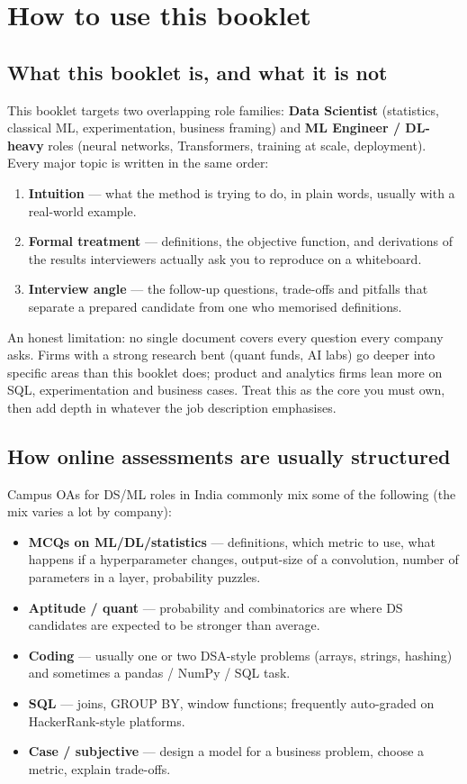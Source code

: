 \chapter{How to use this booklet}

\section*{What this booklet is, and what it is not}
This booklet targets two overlapping role families: \textbf{Data Scientist} (statistics, classical ML, experimentation, business framing) and \textbf{ML Engineer / DL-heavy} roles (neural networks, Transformers, training at scale, deployment). Every major topic is written in the same order:
\begin{enumerate}
  \item \textbf{Intuition} --- what the method is trying to do, in plain words, usually with a real-world example.
  \item \textbf{Formal treatment} --- definitions, the objective function, and derivations of the results interviewers actually ask you to reproduce on a whiteboard.
  \item \textbf{Interview angle} --- the follow-up questions, trade-offs and pitfalls that separate a prepared candidate from one who memorised definitions.
\end{enumerate}

An honest limitation: no single document covers every question every company asks. Firms with a strong research bent (quant funds, AI labs) go deeper into specific areas than this booklet does; product and analytics firms lean more on SQL, experimentation and business cases. Treat this as the core you must own, then add depth in whatever the job description emphasises.

\section*{How online assessments are usually structured}
Campus OAs for DS/ML roles in India commonly mix some of the following (the mix varies a lot by company):
\begin{itemize}
  \item \textbf{MCQs on ML/DL/statistics} --- definitions, which metric to use, what happens if a hyperparameter changes, output-size of a convolution, number of parameters in a layer, probability puzzles.
  \item \textbf{Aptitude / quant} --- probability and combinatorics are where DS candidates are expected to be stronger than average.
  \item \textbf{Coding} --- usually one or two DSA-style problems (arrays, strings, hashing) and sometimes a pandas / NumPy / SQL task.
  \item \textbf{SQL} --- joins, GROUP BY, window functions; frequently auto-graded on HackerRank-style platforms.
  \item \textbf{Case / subjective} --- design a model for a business problem, choose a metric, explain trade-offs.
\end{itemize}

